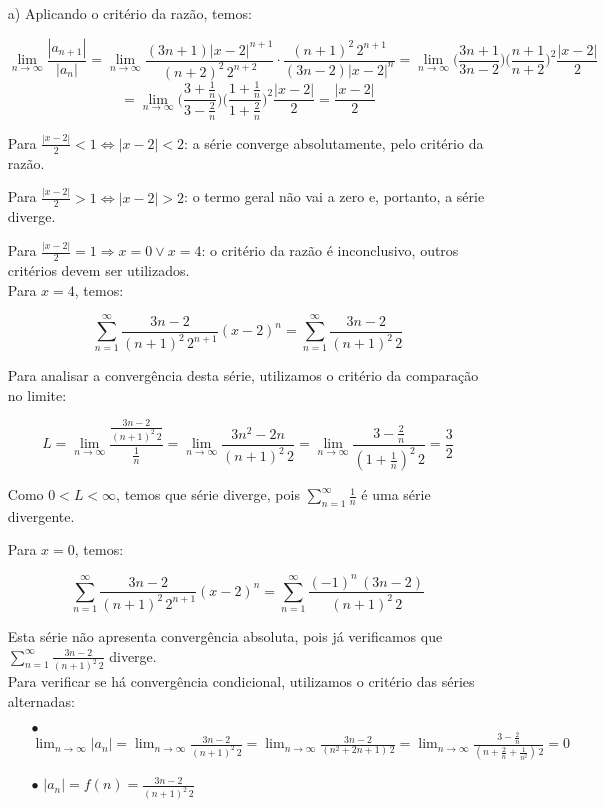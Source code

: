 \documentclass[12pt,a4paper]{article}
\begin{document}
\begin{itemize}
\item[a)] Aplicando o critério da razão, temos:

$$\lim_{n\rightarrow\infty} \frac{|a_{n+1}|}{|a_n|} = \lim_{n\rightarrow\infty} \frac{(3n+1) |x-2|^{n+1}}{(n+2)^2 \, 2^{n+2}}  \cdot \frac{(n+1)^2 \, 2^{n+1}}{(3n-2) |x-2|^n} = \lim_{n\rightarrow\infty} \Big( \frac{3n+1}{3n-2} \Big) \Big( \frac{n+1}{n+2} \Big)^2 \frac{|x-2|}{2}  $$
$$ = \lim_{n\rightarrow\infty} \Bigg( \frac{3+\frac{1}{n}}{3-\frac{2}{n}} \Bigg) \Bigg( \frac{1+\frac{1}{n}}{1+\frac{2}{n}} \Bigg)^2 \frac{|x-2|}{2} = \frac{|x-2|}{2} $$

Para $\frac{|x-2|}{2} < 1 \Leftrightarrow |x-2| < 2$: a série converge absolutamente, pelo critério da razão.

Para $\frac{|x-2|}{2} > 1 \Leftrightarrow |x-2| > 2$: o termo geral não vai a zero e, portanto, a série diverge.

Para $\frac{|x-2|}{2} = 1 \Rightarrow x = 0 \lor x=4$: o critério da razão é inconclusivo, outros critérios devem ser utilizados. \\

Para $x=4$, temos:

$$  \sum_{n=1}^\infty \frac{3n-2}{(n+1)^2 \, 2^{n+1}} (x-2)^n = \sum_{n=1}^\infty \frac{3n-2}{(n+1)^2 \, 2} $$

Para analisar a convergência desta série, utilizamos o critério da comparação no limite:

$$ L = \lim_{n\rightarrow\infty} \frac{\frac{3n-2}{(n+1)^2 \, 2}}{\frac{1}{n}} = \lim_{n\rightarrow\infty} \frac{3n^2-2n}{(n+1)^2 \, 2} = \lim_{n\rightarrow\infty} \frac{3-\frac{2}{n}}{(1+\frac{1}{n})^2 \, 2} = \frac{3}{2}  $$

Como $0 < L < \infty$, temos que série diverge, pois $\displaystyle\sum_{n=1}^\infty \frac{1}{n}$ é uma série divergente.

Para $x=0$, temos:

$$  \sum_{n=1}^\infty \frac{3n-2}{(n+1)^2 \, 2^{n+1}} (x-2)^n = \sum_{n=1}^\infty \frac{(-1)^n \, (3n-2)}{(n+1)^2 \, 2} $$

Esta série não apresenta convergência absoluta, pois já verificamos que $\displaystyle\sum_{n=1}^\infty \frac{3n-2}{(n+1)^2 \, 2}$ diverge. \\

Para verificar se há convergência condicional, utilizamos o critério das séries alternadas: 
    
    \begin{itemize}
    \item[$\bullet$] $\displaystyle\lim_{n \rightarrow \infty} |a_n| = \lim_{n \rightarrow \infty} \frac{3n-2}{(n+1)^2 \, 2} = \lim_{n \rightarrow \infty} \frac{3n-2}{(n^2 + 2n + 1) \, 2} = \lim_{n \rightarrow \infty} \frac{3-\frac{2}{n}}{(n + \frac{2}{n} + \frac{1}{n^2}) \, 2} = 0 $
    \item[$\bullet$] $|a_{n}| = f(n) = \displaystyle\frac{3n-2}{(n+1)^2 \, 2}  $
    

\end{itemize}
\end{itemize}
\end{document}
